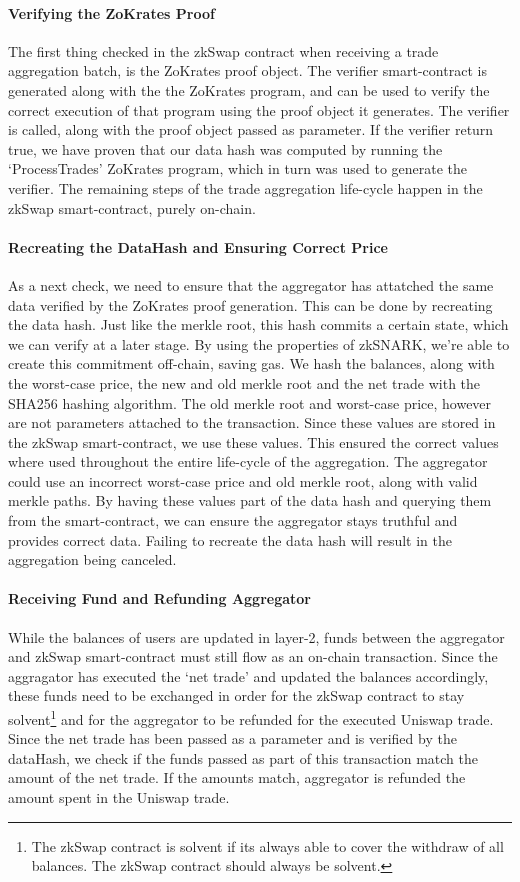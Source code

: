 \documentclass[../../thesis.tex]{subfiles}
\begin{document}
\paragraph{Verifying the ZoKrates Proof}
The first thing checked in the zkSwap contract when receiving a trade aggregation batch, is the ZoKrates proof object. The verifier smart-contract is generated along with the the ZoKrates program, and can be used to verify the correct execution of that program using the proof object it generates. The verifier is called, along with the proof object passed as parameter. If the verifier return true, we have proven that our data hash was computed by running the `ProcessTrades' ZoKrates program, which in turn was used to generate the verifier. The remaining steps of the trade aggregation life-cycle happen in the zkSwap smart-contract, purely on-chain.

\paragraph{Recreating the DataHash and Ensuring Correct Price}
As a next check, we need to ensure that the aggregator has attatched the same data verified by the ZoKrates proof generation. This can be done by recreating the data hash. Just like the merkle root, this hash commits a certain state, which we can verify at a later stage. By using the properties of zkSNARK, we're able to create this commitment off-chain, saving gas. We hash the balances, along with the worst-case price, the new and old merkle root and the net trade with the SHA256 hashing algorithm. The old merkle root and worst-case price, however are not parameters attached to the transaction. Since these values are stored in the zkSwap smart-contract, we use these values. This ensured the correct values where used throughout the entire life-cycle of the aggregation. The aggregator could use an incorrect worst-case price and old merkle root, along with valid merkle paths. By having these values part of the data hash and querying them from the smart-contract, we can ensure the aggregator stays truthful and provides correct data. Failing to recreate the data hash will result in the aggregation being canceled.

\paragraph{Receiving Fund and Refunding Aggregator}
While the balances of users are updated in layer-2, funds between the aggregator and zkSwap smart-contract must still flow as an on-chain transaction. Since the aggragator has executed the `net trade' and updated the balances accordingly, these funds need to be exchanged in order for the zkSwap contract to stay solvent\footnote{The zkSwap contract is solvent if its always able to cover the withdraw of all balances. The zkSwap contract should always be solvent.} and for the aggregator to be refunded for the executed Uniswap trade. Since the net trade has been passed as a parameter and is verified by the dataHash, we check if the funds passed as part of this transaction match the amount of the net trade. If the amounts match, aggregator is refunded the amount spent in the Uniswap trade. 
\end{document}
